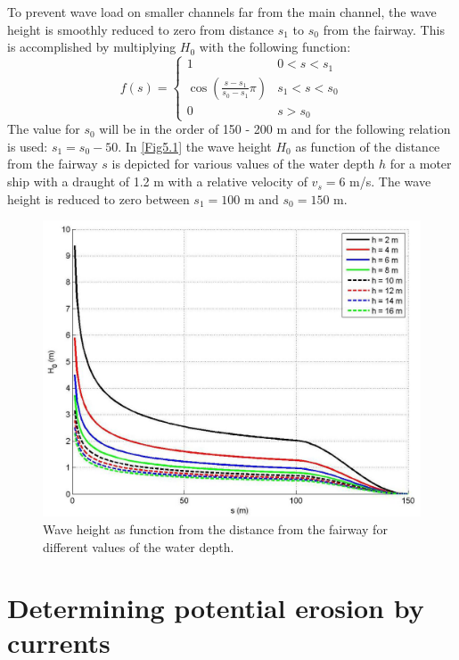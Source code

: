 \clearpage
To prevent wave load on smaller channels far from the main channel, the wave height is smoothly reduced to zero from distance $s_1$ to $s_0$ from the fairway.
This is accomplished by multiplying $H_0$ with the following function:
%
\begin{equation}
f(s) = \left \{ \begin{matrix}
1 & 0 < s < s_1 \\
\cos \left ( \frac{s - s_1}{s_0 - s_1} \pi \right ) & s_1 < s < s_0 \\
0 & s > s_0
\end{matrix} \right .
\end{equation}
%
The value for $s_0$ will be in the order of 150 - 200 m and for  the following relation is used: $s_1 = s_0 - 50$.
In \autoref{Fig5.1} the wave height $H_0$ as function of the distance from the fairway $s$ is depicted for various values of the water depth $h$ for a moter ship with a draught of 1.2 m with a relative velocity of $v_s = 6$ m/s.
The wave height is reduced to zero between $s_1 = 100$ m and $s_0 = 150$ m.

\begin{figure}[!hb]
\includegraphics[width=\textwidth]{figures/Fig5-1.png}
\caption{Wave height as function from the distance from the fairway for different values of the water depth.}
\label{Fig5.1}
\end{figure}


\clearpage
\section{Determining potential erosion by currents} \label{Sec4.2}

